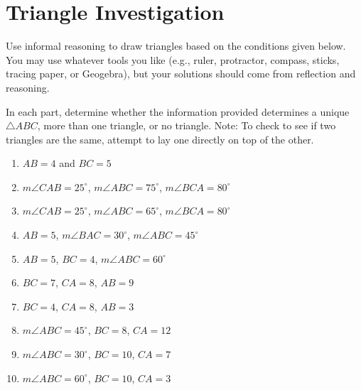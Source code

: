 \newpage

\section{Triangle Investigation}

\begin{prob}
Use informal reasoning to draw triangles based on the conditions given below.  You may use whatever tools you like (e.g., ruler, protractor, compass, sticks, tracing paper, or Geogebra), but your solutions should come from reflection and reasoning.  

In each part, determine whether the information provided determines a unique $\triangle ABC$, more than one triangle, or no triangle.   Note:  To check to see if two triangles are the same, attempt to lay one directly on top of the other.  

\begin{enumerate}

\item $AB = 4$ and $BC = 5$
\item $m\angle CAB = 25^\circ$, $m\angle ABC = 75^\circ$, $m\angle BCA = 80^\circ$
\item $m\angle CAB = 25^\circ$, $m\angle ABC = 65^\circ$, $m\angle BCA = 80^\circ$
\item $AB = 5$, $m\angle BAC = 30^\circ$, $m\angle ABC = 45^\circ$
\item $AB = 5$, $BC = 4$, $m\angle ABC = 60^\circ$
\item $BC = 7$, $CA = 8$, $AB = 9$
\item $BC = 4$, $CA = 8$, $AB = 3$
\item $m\angle ABC = 45^\circ$, $BC = 8$, $CA = 12$
\item $m\angle ABC = 30^\circ$, $BC = 10$, $CA = 7$
\item $m\angle ABC = 60^\circ$, $BC = 10$, $CA = 3$

\end{enumerate}

\end{prob}
